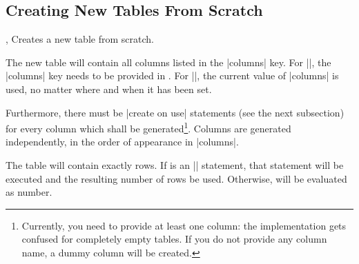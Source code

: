 \subsection{Creating New Tables From Scratch}
\begin{commandlist}{%
	\pgfplotstablenew{},%
	\pgfplotstablenew*{}}
	Creates a new table from scratch. 

	The new table will contain all columns listed in the |columns| key. For |\pgfplotstablenew|, the |columns| key needs to be provided in . For |\pgfplotstablenew*|, the current value of |columns| is used, no matter where and when it has been set.
	

	Furthermore, there must be |create on use| statements (see the next subsection) for every
	column which shall be generated\footnote{Currently, you need to provide at least one column: the implementation gets confused for completely empty tables. If you do not provide any column name, a dummy column will be created.}. Columns are generated
	independently, in the order of appearance in |columns|.

	The table will contain exactly  rows. If  is an |\pgfplotstablegetrowsof| statement, that statement will be executed and the resulting number of rows be  used. Otherwise,  will be evaluated as number.
\begin{codeexample}[]
\loadedtable
\pgfplotstabletypeset[empty cells with={---}]\loadedtable
\end{codeexample}

\begin{codeexample}[]
	\loadedtable
\pgfplotstabletypeset\loadedtable
\end{codeexample}
\end{commandlist}


